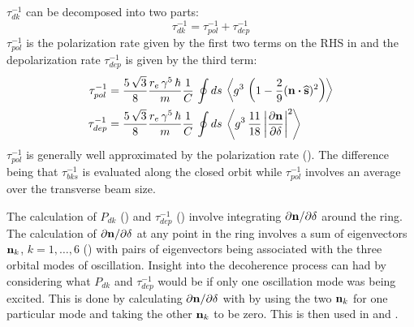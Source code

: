 $\tau_{dk}^{-1}$ can be decomposed into two parts:
\begin{equation}
  \tau_{dk}^{-1} = \tau_{pol}^{-1} + \tau_{dep}^{-1}
  \label{tdk}
\end{equation}
$\tau_{pol}^{-1}$ is the polarization rate given by the first two terms on the
RHS in  and the depolarization rate $\tau_{dep}^{-1}$ is given by the third term:
\begin{align}
  \tau_{pol}^{-1} &= \frac{5 \, \sqrt{3}}{8} \frac{r_e \, \gamma^5 \, \hbar}{m} \frac{1}{C} \,
    \oint ds \, \left< g^3 \, \left( 1 - \frac{2}{9} ({\bf n} \mathbin{\boldsymbol{\cdot}} \widehat{{\bf s}})^2 \right) \right> 
    \nonumber \\
  \tau_{dep}^{-1} &= \frac{5 \, \sqrt{3}}{8} \frac{r_e \, \gamma^5 \, \hbar}{m}
    \frac{1}{C} \, \oint ds \, \left< g^3 \,
    \frac{11}{18} \left| \frac{\partial {\bf n}}{\partial \delta} \right|^2 \right>
    \label{tdep}
\end{align}
$\tau_{pol}^{-1}$ is generally well approximated by the  polarization
rate (). The difference being that $\tau_{bks}^{-1}$ is evaluated along the closed orbit
while $\tau_{pol}^{-1}$ involves an average over the transverse beam size.

The calculation of $P_{dk}$ () and $\tau_{dep}^{-1}$ () involve integrating
$\partial{\bf n}/\partial\delta$ around the ring. The calculation of $\partial{\bf n}/\partial\delta$ at
any point in the ring involves a sum of eigenvectors ${\bf n}_k$, $k = 1, \ldots, 6$ () with
pairs of eigenvectors being associated with the three orbital modes of oscillation. Insight into the
decoherence process can had by considering what $P_{dk}$ and $\tau_{dep}^{-1}$ would be if only
one oscillation mode was being excited. This is done by calculating $\partial{\bf n}/\partial\delta$ with
 by using the two ${\bf n}_k$ for one particular mode and taking the other ${\bf n}_k$ to be zero.
This is then used in  and .

